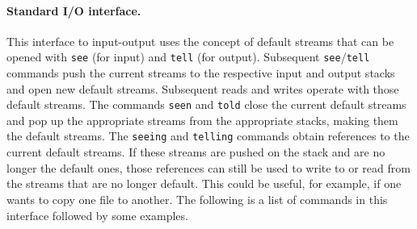 \documentclass[11pt]{article}
\begin{document}
\paragraph{Standard I/O interface.}
This interface to input-output uses the
concept of default streams that can be opened with \texttt{see} (for input)
and \texttt{tell} (for output). Subsequent \texttt{see}/\texttt{tell}
commands push the current streams to the respective input and output stacks
and open new default streams. Subsequent reads and writes operate with
those default streams. The commands \texttt{seen} and \texttt{told} close
the current default streams and pop up the appropriate streams from the
appropriate stacks, making them the default streams.  
The \texttt{seeing} and \texttt{telling} commands obtain references to the
current default streams. If these streams are pushed on the stack and are
no longer the default ones, those references can still be used to write to or
read from the streams that are no longer default. This could be useful, for
example, if one wants to copy one file to another. The following
is a list of commands in this interface followed by some examples.
\end{document}
